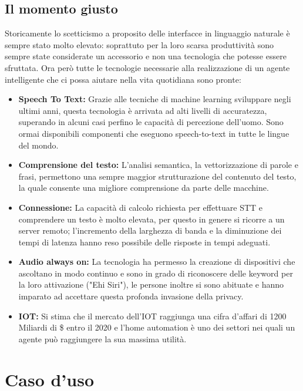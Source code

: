 \documentclass[twoside]{supsistudent}
\begin{document}
\section{Il momento giusto}

Storicamente lo scetticismo a proposito delle interfacce in linguaggio naturale è sempre stato molto elevato: soprattuto per la loro scarsa produttività sono sempre state considerate un accessorio e non una tecnologia che potesse essere sfruttata.
Ora però tutte le tecnologie necessarie alla realizzazione di un agente intelligente che ci possa aiutare nella vita quotidiana sono pronte:
\begin{itemize}
  \item \textbf{Speech To Text:} Grazie alle tecniche di machine learning sviluppare negli ultimi anni, questa tecnologia è arrivata ad alti livelli di accuratezza, superando in alcuni casi perfino le capacità di percezione dell'uomo. Sono ormai disponibili componenti che eseguono speech-to-text in tutte le lingue del mondo.\cite{sttmachinelearning}
  \item \textbf{Comprensione del testo:} L'analisi semantica, la vettorizzazione di parole e frasi, permettono una sempre maggior strutturazione del contenuto del testo, la quale consente una migliore comprensione da parte delle macchine.\cite{word2vec}
  \item \textbf{Connessione:} La capacità di calcolo richiesta per effettuare STT e comprendere un testo è molto elevata, per questo in genere si ricorre a un server remoto; l'incremento della larghezza di banda e la diminuzione dei tempi di latenza hanno reso possibile delle risposte in tempi adeguati.
  \item \textbf{Audio always on:} La tecnologia ha permesso la creazione di dispositivi che ascoltano in modo continuo e sono in grado di riconoscere delle keyword per la loro attivazione ("Ehi Siri"), le persone inoltre si sono abituate e hanno imparato ad accettare questa profonda invasione della privacy.
  \item \textbf{IOT:} Si stima che il mercato dell'IOT raggiunga una cifra d'affari di 1200 Miliardi di \$ entro il 2020 e l'home automation è uno dei settori nei quali un agente può raggiungere la sua massima utilità.
\end{itemize}

\chapter{Caso d'uso}
\end{document}
